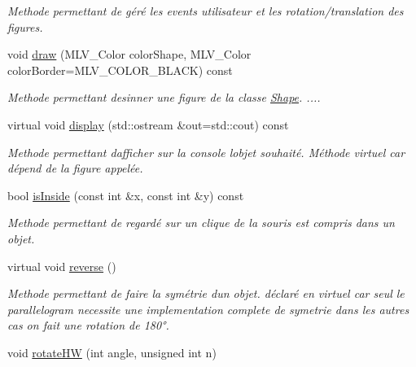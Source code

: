 \begin{DoxyCompactItemize}
\begin{DoxyCompactList}\small\item\em Methode permettant de géré les events utilisateur et les rotation/translation des figures. \end{DoxyCompactList}\item 
void \hyperlink{classgeometric_shape_1_1_shape_ae16cafaabf0742f54f718ba319c1afee}{draw} (M\+L\+V\+\_\+\+Color color\+Shape, M\+L\+V\+\_\+\+Color color\+Border=M\+L\+V\+\_\+\+C\+O\+L\+O\+R\+\_\+\+B\+L\+A\+CK) const
\begin{DoxyCompactList}\small\item\em Methode permettant desinner une figure de la classe \hyperlink{classgeometric_shape_1_1_shape}{Shape}. .... \end{DoxyCompactList}\item 
virtual void \hyperlink{classgeometric_shape_1_1_shape_af666bd629db0595afa79982548b6cf78}{display} (std\+::ostream \&out=std\+::cout) const
\begin{DoxyCompactList}\small\item\em Methode permettant d\textquotesingle{}afficher sur la console l\textquotesingle{}objet souhaité. Méthode virtuel car dépend de la figure appelée. \end{DoxyCompactList}\item 
bool \hyperlink{classgeometric_shape_1_1_shape_a10713940996e923488745dfa7dbe1c46}{is\+Inside} (const int \&x, const int \&y) const
\begin{DoxyCompactList}\small\item\em Methode permettant de regardé sur un clique de la souris est compris dans un objet. \end{DoxyCompactList}\item 
\mbox{\label{classgeometric_shape_1_1_shape_a3890a8bbed0312d75df063615ef1a6d9}} 
virtual void \hyperlink{classgeometric_shape_1_1_shape_a3890a8bbed0312d75df063615ef1a6d9}{reverse} ()
\begin{DoxyCompactList}\small\item\em Methode permettant de faire la symétrie d\textquotesingle{}un objet. déclaré en virtuel car seul le parallelogram necessite une implementation complete de symetrie dans les autres cas on fait une rotation de 180°. \end{DoxyCompactList}\item 
void \hyperlink{classgeometric_shape_1_1_shape_a54b2ed849b4838b665bc46fcd924bdf2}{rotate\+HW} (int angle, unsigned int n)

\end{DoxyCompactItemize}
